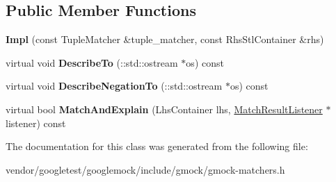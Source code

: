 \subsection*{Public Member Functions}
\begin{DoxyCompactItemize}
\item 
{\bfseries Impl} (const Tuple\+Matcher \&tuple\+\_\+matcher, const Rhs\+Stl\+Container \&rhs)\hypertarget{classtesting_1_1internal_1_1PointwiseMatcher_1_1Impl_aaf6841b254ef78395919dfc5705dd152}{}\label{classtesting_1_1internal_1_1PointwiseMatcher_1_1Impl_aaf6841b254ef78395919dfc5705dd152}

\item 
virtual void {\bfseries Describe\+To} (\+::std\+::ostream $\ast$os) const \hypertarget{classtesting_1_1internal_1_1PointwiseMatcher_1_1Impl_a34f78176359346ba3fd46c7e4c7b08cf}{}\label{classtesting_1_1internal_1_1PointwiseMatcher_1_1Impl_a34f78176359346ba3fd46c7e4c7b08cf}

\item 
virtual void {\bfseries Describe\+Negation\+To} (\+::std\+::ostream $\ast$os) const \hypertarget{classtesting_1_1internal_1_1PointwiseMatcher_1_1Impl_a2098bacac67c13d29709d357033e2d3a}{}\label{classtesting_1_1internal_1_1PointwiseMatcher_1_1Impl_a2098bacac67c13d29709d357033e2d3a}

\item 
virtual bool {\bfseries Match\+And\+Explain} (Lhs\+Container lhs, \hyperlink{classtesting_1_1MatchResultListener}{Match\+Result\+Listener} $\ast$listener) const \hypertarget{classtesting_1_1internal_1_1PointwiseMatcher_1_1Impl_ad3cad1e0b3e5d3a204c5b0f5a95d178b}{}\label{classtesting_1_1internal_1_1PointwiseMatcher_1_1Impl_ad3cad1e0b3e5d3a204c5b0f5a95d178b}

\end{DoxyCompactItemize}


The documentation for this class was generated from the following file\+:\begin{DoxyCompactItemize}
\item 
vendor/googletest/googlemock/include/gmock/gmock-\/matchers.\+h\end{DoxyCompactItemize}
